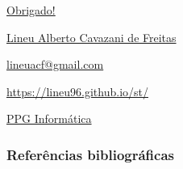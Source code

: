 \documentclass[10pt,
  aspectratio=169,
  serif,
  mathserif,
  professionalfont,
  compress,
  handout,
  ]{beamer}\usepackage[]{graphicx}\usepackage[]{color}
\begin{document}
\begin{frame}[c, allowframebreaks]

\begin{center}

  {\huge \href{https://lineu96.github.io/st/}{Obrigado!}}
  
  \vspace{0.5cm}
    
  {\normalsize \href{https://lineu96.github.io/st/}{Lineu Alberto Cavazani de Freitas}}
  
  {\normalsize \href{https://lineu96.github.io/st/}{lineuacf@gmail.com}}
  
  {\normalsize \href{https://lineu96.github.io/st/}{https://lineu96.github.io/st/}}
  
  {\normalsize \href{http://www.prppg.ufpr.br/ppginformatica/?lang=pb}{PPG Informática}}


\begin{figure} %
\end{figure} %

\end{center}

\end{frame}


\begin{frame}[fragile]
  \frametitle{Referências bibliográficas}
  
  \begin{tiny}
    
  \end{tiny}
  
\end{frame}
\end{document}
